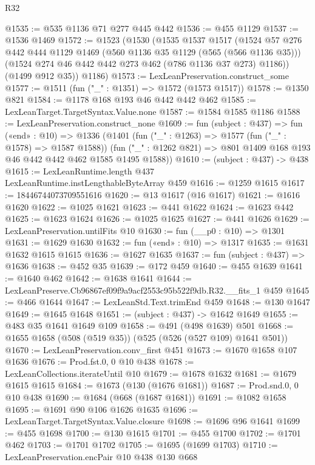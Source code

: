 \begin{lexlean}{R32}
\begin{coremodule}
@1535 := @535 @1136 @71 @277 @445 @442
@1536 := @455 @1129
@1537 := @1536 @1469
@1572 := @1523
    (@1530
      (@1535
        @1537
        @1517
        (@1524
          @57
          @276
          @442
          @444
          @1129
          @1469
          (@560 @1136 @35 @1129 (@565 (@566 @1136 @35)))
          (@1524 @274 @46 @442 @442 @273 @462 (@786 @1136 @37 @273) @1186))
        (@1499 @912 @35))
      @1186)
@1573 := LexLeanPreservation.construct_some
@1577 := @1511 (fun ("_" : @1351) => @1572 (@1573 @1517))
@1578 := @1350 @821
@1584 := @1178 @168 @193 @46 @442 @442 @462
@1585 := LexLeanTarget.TargetSyntax.Value.none
@1587 := @1584 @1585 @1186
@1588 := LexLeanPreservation.construct_none
@1609 := fun (subject : @437) =>
  fun («end» : @10) =>
  @1336
    (@1401
      (fun ("_" : @1263) => @1577 (fun ("_" : @1578) => @1587 @1588))
      (fun ("_" : @1262 @821) => @801 @1409 @168 @193 @46 @442 @442 @462 @1585 @1495 @1588))
@1610 := (subject : @437) -> @438
@1615 := LexLeanRuntime.length @437 LexLeanRuntime.instLengthableByteArray @459
@1616 := @1259 @1615
@1617 := 18446744073709551616
@1620 := @13 @1617 (@16 @1617)
@1621 := @1616 @1620
@1622 := @1025 @1621
@1623 := @441 @1622
@1624 := @1623 @442
@1625 := @1623 @1624
@1626 := @1025 @1625
@1627 := @441 @1626
@1629 := LexLeanPreservation.untilFits @10
@1630 := fun (__p0 : @10) => @1301
@1631 := @1629 @1630
@1632 := fun («end» : @10) => @1317
@1635 := @1631 @1632 @1615 @1615
@1636 := @1627 @1635
@1637 := fun (subject : @437) => @1636
@1638 := @452 @35
@1639 := @172 @459
@1640 := @455 @1639
@1641 := @1640 @462
@1642 := @1638 @1641
@1644 := LexLeanPreserve.Cb96867ef09f9a9acf2553c95b522f9db.R32.__fits_1 @459
@1645 := @466 @1644
@1647 := LexLeanStd.Text.trimEnd @459
@1648 := @130 @1647
@1649 := @1645 @1648
@1651 := (subject : @437) -> @1642 @1649
@1655 := @483 @35 @1641 @1649 @109
@1658 := @491 (@498 @1639) @501
@1668 := @1655 @1658 (@508 (@519 @35)) (@525 (@526 (@527 @109) @1641 @501))
@1670 := LexLeanPreservation.conv_first @451
@1673 := @1670 @1658 @107 @1636
@1676 := Prod.fst.{0, 0} @10 @438
@1678 := LexLeanCollections.iterateUntil @10
@1679 := @1678 @1632
@1681 := @1679 @1615 @1615
@1684 := @1673 (@130 (@1676 @1681))
@1687 := Prod.snd.{0, 0} @10 @438
@1690 := @1684 (@668 (@1687 @1681))
@1691 := @1082 @1658
@1695 := @1691 @90 @106 @1626 @1635
@1696 := LexLeanTarget.TargetSyntax.Value.closure
@1698 := @1696 @96 @1641
@1699 := @455 @1698
@1700 := @130 @1615
@1701 := @455 @1700
@1702 := @1701 @462
@1703 := @1701 @1702
@1705 := @1695 (@1699 @1703)
@1710 := LexLeanPreservation.encPair @10 @438 @130 @668

\end{coremodule}
\end{lexlean}
